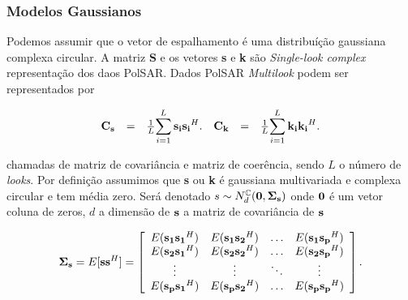 \documentclass[12pt,a4paper]{article}
\begin{document}



\subsubsection{Modelos Gaussianos}


Podemos assumir que o vetor de espalhamento é uma distribuíção gaussiana complexa circular. A matriz {\bf S} e os vetores {\bf s} e {\bf k} são {\it Single-look complex} representação dos daos PolSAR. Dados PolSAR {\it Multilook} podem ser representados por
 
\begin{equation}\label{sec41eqn1}
\begin{array}{ccc}
	{\bf C_{\bf s}}&=&\frac{1}{L}\displaystyle{\sum_{i=1}^{L} {\bf s_i}{\bf s_i}^H} . \\
\end{array}
\begin{array}{ccc}
	{\bf C_{\bf k}}&=&\frac{1}{L}\displaystyle{\sum_{i=1}^{L} {\bf k_i}{\bf k_i}^H} . \\
\end{array}
\end{equation}

chamadas de matriz de covariância e matriz de coerência, sendo $L$ o número de {\it looks}. Por definição assumimos que {\bf s} ou {\bf k} é gaussiana multivariada e complexa circular e tem média zero. Será denotado $s\sim N_d^{\mathbb C}(\bf 0, \Sigma_{\bf s})$ onde $\bf 0$ é um vetor coluna de zeros, $d$ a dimensão de $\bf s$ a matriz de covariância de $\bf s$  

\begin{equation}\label{sec41eqn2}
	{\bf \Sigma_{{\bf s}}} = E[{\bf s}{\bf s}^H] =\left[
\begin{array}{cccc}
	E({\bf s_1}{\bf s_1}^H)  & E({\bf s_1}{\bf s_2}^H) &\hdots & E({\bf s_1}{\bf s_p}^H) \\
	E({\bf s_2}{\bf s_1}^H)  & E({\bf s_2}{\bf s_2}^H) &\hdots &E({\bf s_2}{\bf s_p}^H)\\
        \vdots&\vdots &\ddots &\vdots\\
	E({\bf s_p}{\bf s_1}^H)  & E({\bf s_p}{\bf s_2}^H) &\hdots &E({\bf s_p}{\bf s_p}^H)\\
\end{array}
\right].
\end{equation}
\end{document}
